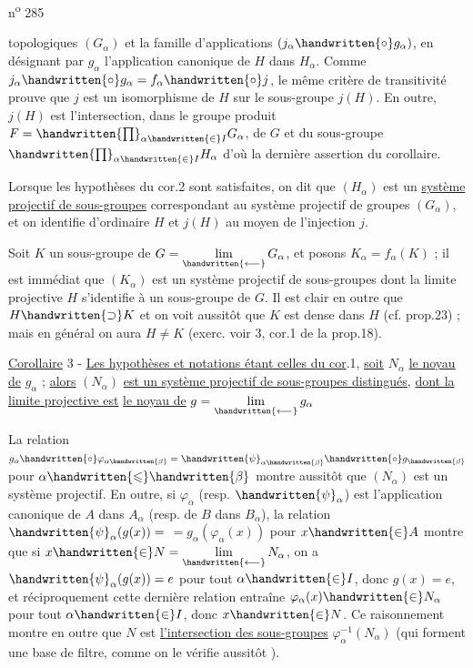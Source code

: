 \hfill n\textsuperscript{o} 285

topologiques $(G_\alpha)$ et la famille d'applications $(j_\alpha\handwritten{\circ}g_\alpha)$, en désignant
par $g_\alpha$ l'application canonique de $H$ dans $H_\alpha$. Comme $j_\alpha\handwritten{\circ}g_\alpha=f_\alpha\handwritten{\circ}j$,
le même critère de transitivité prouve que $j$ est un isomorphisme de $H$
sur le sous-groupe $j(H)$. En outre, $j(H)$ est l'intersection, dans le groupe
produit $F=\handwritten{\prod}_{\alpha\handwritten{\in}I}G_\alpha$, de $G$ et du sous-groupe $\handwritten{\prod}_{\alpha\handwritten{\in}I}H_\alpha$ d'où la dernière
assertion du corollaire.

Lorsque les hypothèses du cor.2 sont satisfaites, on dit que $(H_\alpha)$ est
un \uline{système projectif de sous-groupes} correspondant au système projectif
de groupes $(G_\alpha)$, et on identifie d'ordinaire $H$ et $j(H)$ au moyen de l'injection $j$.

Soit $K$ un sous-groupe de $G=\underset{\handwritten{\longleftarrow}}{\lim}\,G_\alpha$, et posons $K_\alpha=f_\alpha(K)$ ; il est
immédiat que $(K_\alpha)$ est un système projectif de sous-groupes dont la
limite projective $H$ s'identifie à un sous-groupe de $G$. Il est clair
en outre que $H\handwritten{\supset}K$ et on voit aussitôt que $K$ est dense dans $H$
(cf. prop.23) ; mais en général on aura $H\ne K$ (exerc. voir \handwritten{\S}3,
cor.1 de la prop.18).

\uline{Corollaire} 3 - \uline{Les hypothèses et notations étant celles du cor}.1,
\uline{soit} $N_\alpha$ \uline{le noyau de} $g_\alpha$ ; \uline{alors} $(N_\alpha)$ \uline{est un système projectif de sous-groupes distingués}, \uline{dont la limite projective est} \uline{le noyau de} $g=\underset{\handwritten{\longleftarrow}}{\lim}\,g_\alpha$

La relation $g_\alpha\handwritten{\circ}\varphi_{\alpha\handwritten{\beta}}=\handwritten{\psi}_{\alpha\handwritten{\beta}}\handwritten{\circ}g_{\handwritten{\beta}}$ pour $\alpha\handwritten{\leqslant}\handwritten{\beta}$ montre aussitôt que
$(N_\alpha)$ est un système projectif. En outre, si $\varphi_\alpha$ (resp. $\handwritten{\psi}_\alpha$) est l'application
canonique de $A$ dans $A_\alpha$ (resp. de $B$ dans $B_\alpha$), la relation $\handwritten{\psi}_\alpha(g(x))=$
$=g_\alpha(\varphi_\alpha(x))$ pour $x\handwritten{\in}A$ montre que si $x\handwritten{\in}N=\underset{\handwritten{\longleftarrow}}{\lim}\,N_\alpha$, on a $\handwritten{\psi}_\alpha(g(x))=e$
pour tout $\alpha\handwritten{\in}I$, donc $g(x)=e$, et réciproquement cette dernière relation
entraîne $\varphi_\alpha(x)\handwritten{\in}N_\alpha$ pour tout $\alpha\handwritten{\in}I$, donc $x\handwritten{\in}N$. Ce raisonnement montre
en outre que $N$ est \uline{l'intersection des sous-groupes} $\varphi^{-1}_\alpha(N_\alpha)$ (qui forment
une base de filtre, comme on le vérifie aussitôt ).
